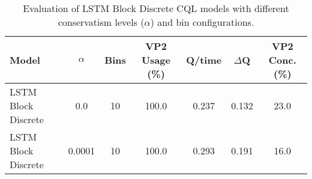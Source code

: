 \begin{table}[ht]
\centering
\caption{Evaluation of LSTM Block Discrete CQL models with different conservatism levels ($\alpha$) and bin configurations.}
\label{tab:lstm_cql_evaluation}
\begin{tabular}{lcccccc}
\toprule
Model & $\alpha$ & Bins & VP2 Usage (\%) & Q/time & $\Delta$Q & VP2 Conc. (\%) \\
\midrule
LSTM Block Discrete & 0.0 & 10 & 100.0 & 0.237 & 0.132 & 23.0 \\
LSTM Block Discrete & 0.0001 & 10 & 100.0 & 0.293 & 0.191 & 16.0 \\
\bottomrule
\end{tabular}
\end{table}